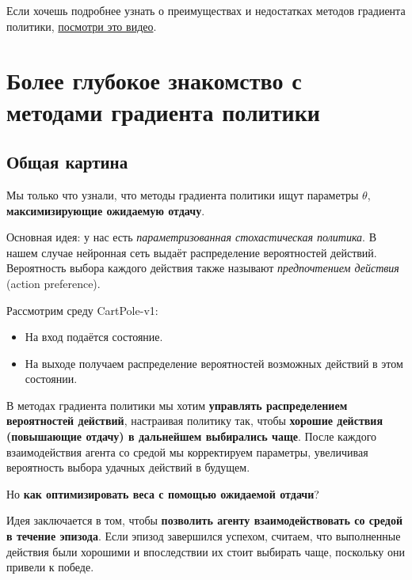 \documentclass[11pt,a4paper]{article}
\begin{document}
Если хочешь подробнее узнать о преимуществах и недостатках методов градиента политики, \href{https://youtu.be/y3oqOjHilio}{посмотри это видео}.

\section{Более глубокое знакомство с методами градиента политики}\label{diving-deeper-into-policy-gradient-methods}

\subsection{Общая картина}\label{getting-the-big-picture}

Мы только что узнали, что методы градиента политики ищут параметры \(\theta\), \textbf{максимизирующие ожидаемую отдачу}.

Основная идея: у нас есть \emph{параметризованная стохастическая политика}. В нашем случае нейронная сеть выдаёт распределение вероятностей действий. Вероятность выбора каждого действия также называют \emph{предпочтением действия} (action preference).

Рассмотрим среду CartPole-v1:

\begin{itemize}
\tightlist
\item
  На вход подаётся состояние.
\item
  На выходе получаем распределение вероятностей возможных действий в этом состоянии.
\end{itemize}


В методах градиента политики мы хотим \textbf{управлять распределением вероятностей действий}, настраивая политику так, чтобы \textbf{хорошие действия (повышающие отдачу) в дальнейшем выбирались чаще}. После каждого взаимодействия агента со средой мы корректируем параметры, увеличивая вероятность выбора удачных действий в будущем.

Но \textbf{как оптимизировать веса с помощью ожидаемой отдачи}?

Идея заключается в том, чтобы \textbf{позволить агенту взаимодействовать со средой в течение эпизода}. Если эпизод завершился успехом, считаем, что выполненные действия были хорошими и впоследствии их стоит выбирать чаще, поскольку они привели к победе.
\end{document}
